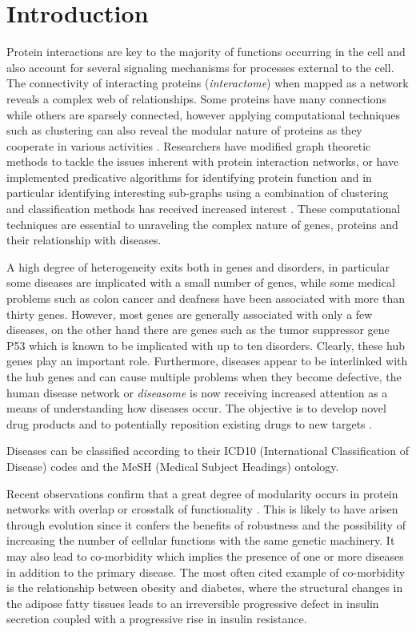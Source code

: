 \documentclass[authoryear,10pt,preprint]{elsarticle}
\begin{document}
\section{Introduction}
Protein interactions are key to the majority of functions occurring in the cell and also account for several signaling mechanisms for processes external to the cell. The connectivity of interacting proteins ({\it interactome})  when mapped as a network reveals a complex web of relationships. Some proteins have many connections while others are sparsely connected, however applying computational techniques such as clustering can also reveal the modular nature of proteins as they cooperate in various activities \citep{Barabasi2011,McGarry2013}. Researchers have modified graph theoretic methods to tackle the issues inherent with protein interaction networks, or have implemented predicative algorithms for identifying protein function \citep{Nabieva05,Shafer06} and in particular identifying interesting sub-graphs using a combination of clustering and classification methods has received increased interest \citep{Lee11,Klamt06}. These computational techniques are essential to unraveling the complex nature of genes, proteins and their relationship with diseases. 

A high degree of heterogeneity exits both in genes and disorders, in particular some diseases are implicated with a small number of genes, while some medical problems such as colon cancer and deafness have been associated with more than thirty genes. However, most genes are generally associated with only a few diseases, on the other hand there are genes such as the tumor suppressor gene P53 which is known to be implicated with up to ten disorders. Clearly, these hub genes play an important role. Furthermore, diseases appear to be interlinked with the hub genes and can cause multiple problems when they become defective, the human disease network  or \emph{diseasome} \citep{Barrenas2009,McGarry2014a} is now receiving increased attention as a means of understanding how diseases occur. The objective is to develop novel drug products and to potentially reposition existing drugs to new targets \citep{He2011,Hu2009, McGarry2016a}. \citep{Menche2015,Ghiassian2015,Barabasi2011,Barabasi2004,Vidal2011}

Diseases can be classified according to their ICD10 (International Classification of Disease) codes and the MeSH (Medical Subject Headings) ontology. 

Recent observations confirm that a great degree of modularity occurs in protein networks with overlap or crosstalk of functionality \citep{McGarry2013,McGarry2014a}. This is likely to have arisen through evolution since it confers the benefits of robustness and the possibility of increasing the number of cellular functions with the same genetic machinery.  It may also lead to co-morbidity which implies the presence of one or more diseases in addition to the primary disease. The most often cited example of co-morbidity is the relationship between obesity and diabetes, where the structural changes in the adipose fatty tissues leads to an irreversible progressive defect in insulin secretion coupled with a progressive rise in insulin resistance. 
\end{document}

